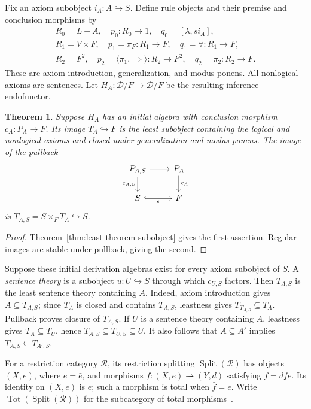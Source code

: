 \documentclass[11pt]{article}
\newtheorem{theorem}{Theorem}[section]
\theoremstyle{definition}\newtheorem{definition}[theorem]{Definition}
\newcommand{\Tot}{\operatorname{Tot}}
\newcommand{\Split}{\operatorname{Split}}
\begin{document}
Fix an axiom subobject $i_A:A\hookrightarrow S$. Define rule objects
and their premise and conclusion morphisms by
\begin{gather*}
 R_0=L+A,\quad p_0:R_0\to1,\quad q_0=[\lambda,si_A],\\
 R_1=V\times F,\quad p_1=\pi_F:R_1\to F,
             \quad q_1=\forall:R_1\to F,\\
 R_2=F^2,\quad p_2=\langle\pi_1,\Rightarrow\rangle:R_2\to F^2,
             \quad q_2=\pi_2:R_2\to F.
\end{gather*}
These are axiom introduction, generalization, and modus ponens.
All nonlogical axioms are sentences. Let $H_A:\mathcal D/F\to
\mathcal D/F$ be the resulting inference endofunctor.

\begin{theorem}\label{thm:first-order-theory}
Suppose $H_A$ has an initial algebra with conclusion morphism
$c_A:P_A\to F$. Its image $T_A\hookrightarrow F$ is the least
subobject containing the logical and nonlogical axioms and closed
under generalization and modus ponens. The image of the pullback
\[
\begin{tikzcd}
 P_{A,S}\arrow[r]\arrow[d,"c_{A,S}"'] & P_A\arrow[d,"c_A"]\\
 S\arrow[r,hook,"s"'] & F
\end{tikzcd}
\]
is $T_{A,S}=S\times_F T_A\hookrightarrow S$.
\end{theorem}
\begin{proof}
Theorem~\ref{thm:least-theorem-subobject} gives the first assertion.
Regular images are stable under pullback, giving the second.
\end{proof}

Suppose these initial derivation algebras exist for every axiom
subobject of $S$. A \emph{sentence theory} is a subobject
$u:U\hookrightarrow S$ through which $c_{U,S}$ factors.
Then $T_{A,S}$ is the least sentence theory containing $A$.
Indeed, axiom introduction gives $A\subseteq T_{A,S}$; since $T_A$
is closed and contains $T_{A,S}$, leastness gives
$T_{T_{A,S}}\subseteq T_A$. Pullback proves closure of $T_{A,S}$.
If $U$ is a sentence theory containing $A$, leastness gives
$T_A\subseteq T_U$, hence
$T_{A,S}\subseteq T_{U,S}\subseteq U$.
It also follows that $A\subseteq A'$ implies
$T_{A,S}\subseteq T_{A',S}$.

For a restriction category $\mathcal R$, its restriction splitting
$\Split(\mathcal R)$ has objects $(X,e)$, where $e=\bar e$, and
morphisms $f:(X,e)\rightharpoonup(Y,d)$ satisfying $f=dfe$.
Its identity on $(X,e)$ is $e$; such a morphism is total when
$\bar f=e$. Write $\Tot(\Split(\mathcal R))$ for the subcategory
of total morphisms~\cite[Section 2.3.3]{CockettLack}.
\end{document}
